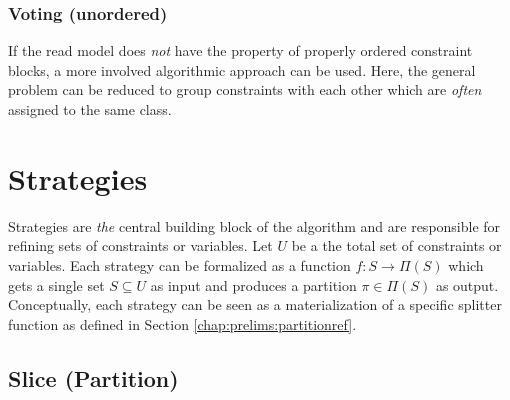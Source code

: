			\subsubsection{Voting (unordered)}
			\label{chap:tree:classifiers:cooccurence}
			
				If the read model does \textit{not} have the property of properly ordered constraint blocks, a more involved algorithmic approach can be used.
				Here, the general problem can be reduced to group constraints with each other which are \textit{often} assigned to the same class. 
					
				\clearpage
		
%	
%			
		
	\section{Strategies}
	\label{chap:tree:strategies}
	
		Strategies are \textit{the} central building block of the algorithm and are responsible for refining sets of constraints or variables.
		Let $U$ be a the total set of constraints or variables.
		Each strategy can be formalized as a function $f: S \rightarrow \Pi(S)$ which gets a single set $S \subseteq U$ as input and produces a partition $\pi \in \Pi(S)$ as output.
		Conceptually, each strategy can be seen as a materialization of a specific splitter function as defined in Section \ref{chap:prelims:partitionref}.
		
	
		\subsection{Slice (Partition)}
		\label{chap:tree:strategies:slice:part}
		

